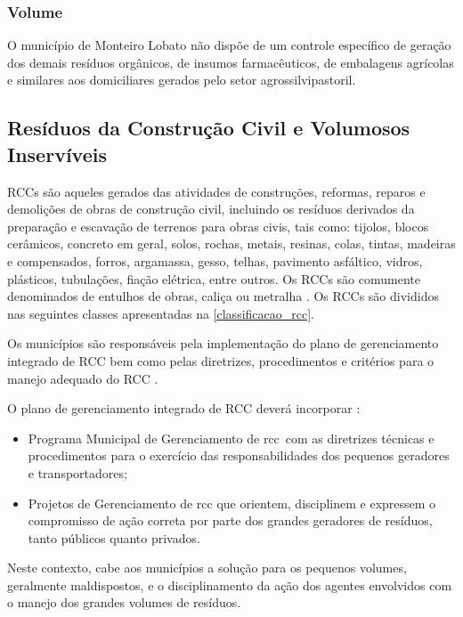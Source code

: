 \subsubsection{Volume}
O município de Monteiro Lobato não dispõe de um controle específico de geração dos demais resíduos orgânicos, de insumos farmacêuticos, de embalagens agrícolas e similares aos domiciliares gerados pelo setor agrossilvipastoril.

\subsection{Resíduos da Construção Civil e Volumosos Inservíveis}
RCCs são aqueles gerados das atividades de construções, reformas, reparos e demolições de obras de construção civil, incluindo os resíduos derivados da preparação e escavação de terrenos para obras civis, tais como: tijolos, blocos cerâmicos, concreto em geral, solos, rochas, metais, resinas, colas, tintas, madeiras e compensados, forros, argamassa, gesso, telhas, pavimento asfáltico, vidros, plásticos, tubulações, fiação elétrica, entre outros. Os RCCs são comumente denominados de entulhos de obras, caliça ou metralha \cite{brasil:12305, conama:307}. Os RCCs são divididos nas seguintes classes apresentadas na \autoref{classificacao_rcc}.



Os municípios são responsáveis pela implementação do plano de gerenciamento integrado de RCC bem como pelas diretrizes, procedimentos e critérios para o manejo adequado do RCC \cite{conama:307}. 

O plano de gerenciamento integrado de RCC deverá incorporar \cite{conama:307}:

\begin{itemize}
	\item Programa Municipal de Gerenciamento de \gls{rcc} com as diretrizes técnicas e procedimentos para o exercício das responsabilidades dos pequenos geradores e transportadores;
	\item Projetos de Gerenciamento de \gls{rcc} que orientem, disciplinem e expressem o compromisso de ação correta por parte dos grandes geradores de resíduos, tanto públicos quanto privados.
\end{itemize}

Neste contexto, cabe aos municípios a solução para os pequenos volumes, geralmente maldispostos, e o disciplinamento da ação dos agentes envolvidos com o manejo dos grandes volumes de resíduos.

